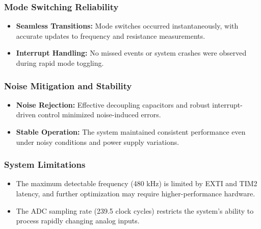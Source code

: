 \subsubsection{Mode Switching Reliability}
\begin{itemize}[leftmargin=2em]
    \item \textbf{Seamless Transitions:} Mode switches occurred instantaneously, with accurate updates to frequency and resistance measurements.
    \item \textbf{Interrupt Handling:} No missed events or system crashes were observed during rapid mode toggling.
\end{itemize}

\subsubsection{Noise Mitigation and Stability}
\begin{itemize}[leftmargin=2em]
    \item \textbf{Noise Rejection:} Effective decoupling capacitors \cite{ne555-timer-datasheet} and robust interrupt-driven control minimized noise-induced errors.
    \item \textbf{Stable Operation:} The system maintained consistent performance even under noisy conditions and power supply variations.
\end{itemize}

\subsubsection{System Limitations}
\begin{itemize}[leftmargin=2em]
    \item The maximum detectable frequency (480 kHz) is limited by EXTI and TIM2 latency, and further optimization may require higher-performance hardware.
    \item The ADC sampling rate (239.5 clock cycles) \cite{interfacex} restricts the system's ability to process rapidly changing analog inputs.
\end{itemize}
